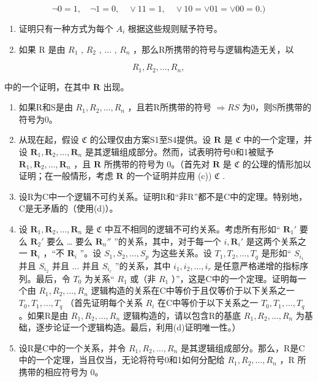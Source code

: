 \[
\neg 0 = 1, \quad \neg 1 = 0, \quad \vee 1 1 = 1, \quad \vee 1 0 = \vee 0 1 = \vee 0 0 = 0.)
\]

\begin{enumerate}
\def\labelenumi{(\alph{enumi})}
\item
  证明只有一种方式为每个 \(A_{i}\) 根据这些规则赋予符号。
\item
  如果 R 是由 \(R_{1}\) , \(R_{2}\) , \(\ldots\) , \(R_{n}\) ，那么R所携带的符号与逻辑构造无关，以
\end{enumerate}

\[
R _ {1}, R _ {2}, \dots , R _ {n},
\]

中的一个证明，在其中 \(\pmb{R}\) 出现。

\begin{enumerate}
\def\labelenumi{(\alph{enumi})}
\setcounter{enumi}{2}
\item
  如果R和S是由 \(R_{1}, R_{2}, \ldots, R_{n}\) ，且若R所携带的符号 \(\Longrightarrow RS\) 为0，则S所携带的符号为0。
\item
  从现在起，假设 \(\mathfrak{C}\) 的公理仅由方案S1至S4提供。设 \(\pmb{R}\) 是 \(\mathfrak{C}\) 中的一个定理，并设 \(\pmb{R}_1, \pmb{R}_2, \ldots, \pmb{R}_n\) 是其逻辑组成部分。然而，试表明符号0和1被赋予 \(\pmb{R}_1, \pmb{R}_2, \ldots, \pmb{R}_n\) ，且 \(\pmb{R}\) 所携带的符号为 0。（首先对 \(\pmb{R}\) 是 \(\mathfrak{C}\) 的公理的情形加以证明；在一般情形，考虑 \(\pmb{R}\) 的一个证明并应用 (c)) \(\mathfrak{C}\) .
\item
  设R为C中一个逻辑不可约关系。证明R和“非R”都不是C中的定理。特别地，C是无矛盾的（使用(d)）。
\item
  设 \(\mathbf{R}_1, \mathbf{R}_2, \ldots, \mathbf{R}_n\) 是 \(\mathfrak{C}\) 中互不相同的逻辑不可约关系。考虑所有形如“ \(\mathbf{R}_1'\) 要么 \(\mathbf{R}_2'\) 要么 \ldots{} 要么 \(\mathbf{R}_n''\) ”的关系，其中，对于每一个 \(i, \mathbf{R}_i'\) 是这两个关系之一 \(\mathbf{R}_i\) ，``不 \(\mathbf{R}_i\) ''。设 \(S_1, S_2, \ldots, S_p\) 为这些关系。设 \(T_1, T_2, \ldots, T_q\) 是形如“ \(S_{i_{1}}\) 并且 \(S_{i_{2}}\) 并且 \(\ldots\) 并且 \(S_{i_{r}}\) ”的关系，其中 \(i_{1}, i_{2}, \ldots, i_{r}\) 是任意严格递增的指标序列。最后，令 \(T_{0}\) 为关系“ \(R_{1}\) 或（非 \(R_{1}\) ）''，这是C中的一个定理。证明每一个由 \(R_{1}, R_{2}, \ldots, R_{n}\) 逻辑构造的关系在C中等价于且仅等价于以下关系之一 \(T_{0}, T_{1}, \ldots, T_{q}\) （首先证明每个关系 \(R_{i}\) 在C中等价于以下关系之一 \(T_{0}, T_{1}, \ldots, T_{q}\) 。如果R是由 \(R_{1}, R_{2}, \ldots, R_{n}\) 逻辑构造的，请以包含R的基底 \(R_{1}, R_{2}, \ldots, R_{n}\) 为基础，逐步论证一个逻辑构造。最后，利用(d)证明唯一性。）
\item
  设R是C中的一个关系，并令 \(R_{1}, R_{2}, \ldots, R_{n}\) 是其逻辑组成部分。那么，R是C中的一个定理，当且仅当，无论将符号0和1如何分配给 \(R_{1}, R_{2}, \ldots, R_{n}\) ，R 所携带的相应符号为 0。
\end{enumerate}

